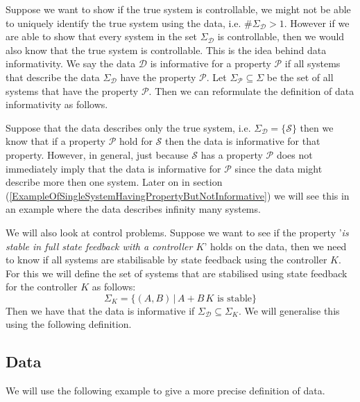 Suppose we want to show if the true system is controllable, we might not be able to uniquely identify the true system using the data, i.e. $\# \Sigma_\mathcal{D} > 1$. However if we are able to show that every system in the set $\Sigma_\mathcal{D}$ is controllable, then we would also know that the true system is controllable. This is the idea behind data informativity. We say the data $\mathcal{D}$ is informative for a property $\mathcal{P}$ if all systems that describe the data $\Sigma_\mathcal{D}$ have the property $\mathcal{P}$. Let $\Sigma_\mathcal{P} \subseteq \Sigma$ be the set of all systems that have the property $\mathcal{P}$. Then we can reformulate the definition of data informativity as follows.


Suppose that the data describes only the true system, i.e. $\Sigma_{\mathcal{D}} = \{ \mathcal{S} \}$ then we know that if a property $\mathcal{P}$ hold for $\mathcal{S}$ then the data is informative for that property. However, in general, just because $\mathcal{S}$ has a property $\mathcal{P}$ does not immediately imply that the data is informative for $\mathcal{P}$ since the data might describe more then one system. Later on in section (\ref{ExampleOfSingleSystemHavingPropertyButNotInformative}) we will see this in an example where the data describes infinity many systems. 

We will also look at control problems. Suppose we want to see if the property '\textit{is stable in full state feedback with a controller $K$}' holds on the data, then we need to know if all systems are stabilisable by state feedback using the controller $K$. For this we will define the set of systems that are stabilised using state feedback for the controller $K$ as follows:
\[ \Sigma_K = \{ (A,B) \, | \, A + B \, K \mbox{ is stable} \} \]
Then we have that the data is informative if $\Sigma_\mathcal{D} \subseteq \Sigma_K$. We will generalise this using the following definition.



\subsection{Data}
We will use the following example \cite[Ex 2]{waarde2019data} to give a more precise definition of data.

